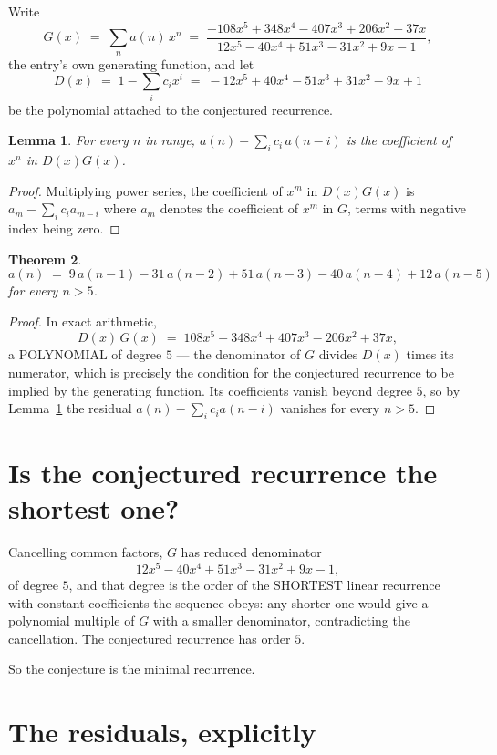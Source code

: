 \documentclass[11pt,a4paper]{article}
\theoremstyle{plain}
\newtheorem{theorem}{Theorem}
\newtheorem{lemma}[theorem]{Lemma}
\theoremstyle{definition}
\begin{document}
Write
\[
G(x)\;=\;\sum_{n}a(n)\,x^{n}\;=\;\frac{- 108 x^{5} + 348 x^{4} - 407 x^{3} + 206 x^{2} - 37 x}{12 x^{5} - 40 x^{4} + 51 x^{3} - 31 x^{2} + 9 x - 1},
\]
the entry's own generating function, and let
\[
D(x)\;=\;1-\sum_i c_i x^{i}\;=\;- 12 x^{5} + 40 x^{4} - 51 x^{3} + 31 x^{2} - 9 x + 1
\]
be the polynomial attached to the conjectured recurrence.

\begin{lemma}\label{lem:key}
For every $n$ in range, $a(n)-\sum_i c_i\,a(n-i)$ is the coefficient of $x^{n}$ in
$D(x)G(x)$.
\end{lemma}

\begin{proof}
Multiplying power series, the coefficient of $x^{m}$ in $D(x)G(x)$ is
$a_m-\sum_i c_i a_{m-i}$ where $a_m$ denotes the coefficient of $x^{m}$ in $G$, terms with
negative index being zero.
\end{proof}

\begin{theorem}
\[
a(n)\;=\;9\,a(n-1) - 31\,a(n-2) + 51\,a(n-3) - 40\,a(n-4) + 12\,a(n-5)
\]
for every $n>5$.
\end{theorem}

\begin{proof}
In exact arithmetic,
\[
D(x)\,G(x)\;=\;108 x^{5} - 348 x^{4} + 407 x^{3} - 206 x^{2} + 37 x,
\]
a POLYNOMIAL of degree $5$ --- the denominator of $G$ divides $D(x)$ times its numerator,
which is precisely the condition for the conjectured recurrence to be implied by the
generating function. Its coefficients vanish beyond degree $5$, so by
Lemma~\ref{lem:key} the residual $a(n)-\sum_ic_ia(n-i)$ vanishes for every
$n>5$.
\end{proof}

\section{Is the conjectured recurrence the shortest one?}

Cancelling common factors, $G$ has reduced denominator
\[
12 x^{5} - 40 x^{4} + 51 x^{3} - 31 x^{2} + 9 x - 1,
\]
of degree $5$, and that degree is the order of the SHORTEST linear recurrence with
constant coefficients the sequence obeys: any shorter one would give a polynomial multiple of
$G$ with a smaller denominator, contradicting the cancellation. The conjectured recurrence has
order $5$.

So the conjecture is the minimal recurrence.

\section{The residuals, explicitly}
\end{document}
